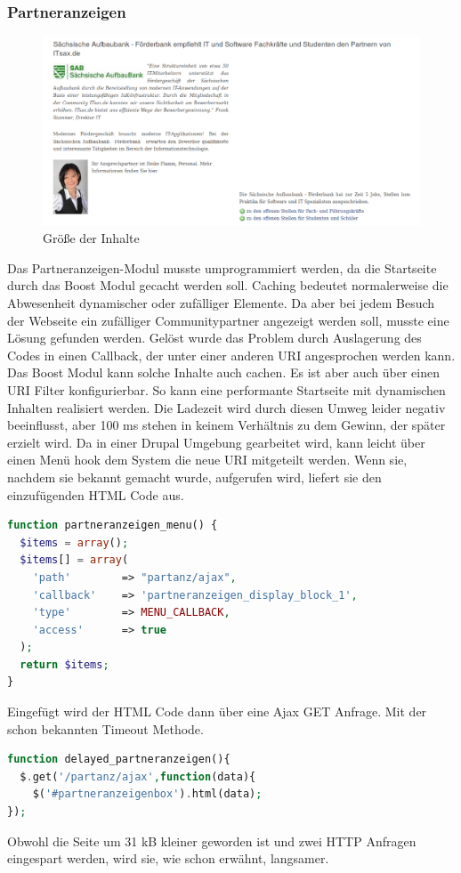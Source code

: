 \subsubsection{Partneranzeigen}
\begin{figure}[!ht]
  \centering
  \includegraphics[width=1.1\textwidth]{material/partneranzeigen.png}
  \caption{Größe der Inhalte}
  \label{fig:partneranzeigen}
\end{figure}
Das Partneranzeigen-Modul musste umprogrammiert werden, da die Startseite durch das Boost Modul gecacht werden soll. Caching bedeutet normalerweise die Abwesenheit dynamischer oder zufälliger Elemente. Da aber bei jedem Besuch der Webseite ein zufälliger Communitypartner angezeigt werden soll, musste eine Lösung gefunden werden. Gelöst wurde das Problem durch Auslagerung des Codes in einen Callback, der unter einer anderen URI angesprochen werden kann. Das Boost Modul kann solche Inhalte auch cachen. Es ist aber auch über einen URI Filter konfigurierbar. So kann eine performante Startseite mit dynamischen Inhalten realisiert werden. Die Ladezeit wird durch diesen Umweg leider negativ beeinflusst, aber 100 ms stehen in keinem Verhältnis zu dem Gewinn, der später erzielt wird. Da in einer Drupal Umgebung gearbeitet wird, kann leicht über einen Menü hook dem System die neue URI mitgeteilt werden. Wenn sie, nachdem sie bekannt gemacht wurde, aufgerufen wird, liefert sie den einzufügenden HTML Code aus.
\begin{lstlisting}[language=php,label=Ajax - hook,caption=Ajax - hook]
function partneranzeigen_menu() {
  $items = array();
  $items[] = array(
    'path'        => "partanz/ajax",
    'callback'    => 'partneranzeigen_display_block_1',
    'type'        => MENU_CALLBACK,
    'access'      => true
  );
  return $items;
}
\end{lstlisting}
Eingefügt wird der HTML Code dann über eine Ajax GET Anfrage. Mit der schon bekannten Timeout Methode.
\begin{lstlisting}[language=php,label=Ajax - GET,caption=Ajax - GET]
function delayed_partneranzeigen(){
  $.get('/partanz/ajax',function(data){
    $('#partneranzeigenbox').html(data);
});
\end{lstlisting}
Obwohl die Seite um 31 kB kleiner geworden ist und zwei HTTP Anfragen eingespart werden, wird sie, wie schon erwähnt, langsamer.


